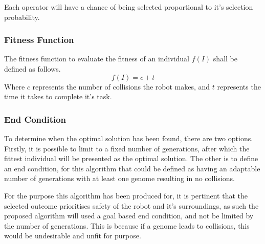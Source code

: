 Each operator will have a chance of being selected proportional to it's selection probability.
\subsubsection{Fitness Function}
The fitness function to evaluate the fitness of an individual $f(I)$ shall be defined as follows.
\begin{equation}
	f(I) = c + t\label{eq:fitnessFunction}
\end{equation}
Where $c$ represents the number of collisions the robot makes, and $t$ represents the time it takes to complete it's task.
\subsubsection{End Condition}
To determine when the optimal solution has been found, there are two options. Firstly, it is possible to limit to a fixed number of generations, after which the fittest individual will be presented as the optimal solution. The other is to define an end condition, for this algorithm that could be defined as having an adaptable number of generations with at least one genome resulting in no collisions.

For the purpose this algorithm has been produced for, it is pertinent that the selected outcome prioritises safety of the robot and it's surroundings, as such the proposed algorithm will used a goal based end condition, and not be limited by the number of generations. This is because if a genome leads to collisions, this would be undesirable and unfit for purpose.
